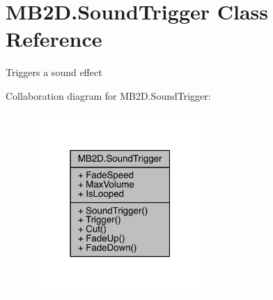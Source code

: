 \hypertarget{class_m_b2_d_1_1_sound_trigger}{}\section{M\+B2\+D.\+Sound\+Trigger Class Reference}
\label{class_m_b2_d_1_1_sound_trigger}


Triggers a sound effect  




Collaboration diagram for M\+B2\+D.\+Sound\+Trigger\+:
\nopagebreak
\begin{figure}[H]
\begin{center}
\leavevmode
\includegraphics[width=187pt]{class_m_b2_d_1_1_sound_trigger__coll__graph}
\end{center}
\end{figure}
